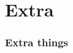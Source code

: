 \documentclass[xcolor=dvipsnames, aspectratio=1610]{beamer}
\begin{document}
\begin{frame}
\begin{columns}
   \begin{column}{0.18\textwidth}
   \end{column}
   
   \begin{column}{0.14\textwidth}
   \end{column}

\end{columns}  
 
\end{frame}


\section{Extra}

\begin{frame}[noframenumbering]
\frametitle{Extra things}

\end{frame}
\end{document}
